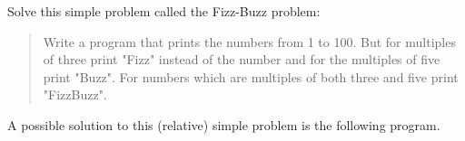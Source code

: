 \begin{Exercise}[title={FizzBuzz},difficulty=1]
\label{ex:fizzbuzz}
\Question \label{ex:fizzbuzz q1} Solve this simple problem called
the Fizz-Buzz \cite{fizzbuzz} problem:
\begin{quote}
Write a program that prints the numbers from 1 to 100. But for multiples
of three print "Fizz" instead of the number and for the multiples of
five print "Buzz". For numbers which are multiples of both three and
five print "FizzBuzz".
\end{quote}
\end{Exercise}

\begin{Answer}
\Question A possible
solution to this (relative) simple problem is the following program.

\end{Answer}
